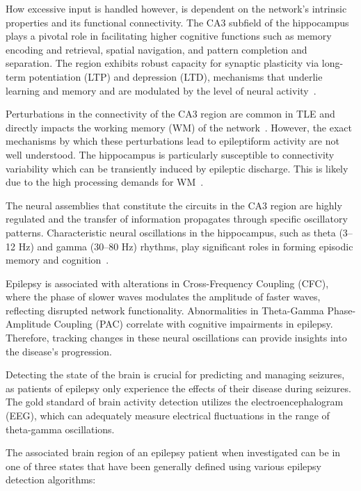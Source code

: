 How excessive input is handled however, is dependent on the network's intrinsic properties and its functional connectivity.
The CA3 subfield of the hippocampus plays a pivotal role in facilitating higher cognitive functions such as memory encoding and retrieval,
spatial navigation, and pattern completion and separation. The region exhibits robust capacity for synaptic plasticity via long-term potentiation
(LTP) and depression (LTD), mechanisms that underlie learning and memory and are modulated by the level of neural activity~\parencite{stokesComplementaryRolesHuman2015}.

Perturbations in the connectivity of the CA3 region are common in TLE and directly impacts the working memory (WM)
of the network~\parencite{arskiOscillatoryBasisWorking2021}. However, the exact mechanisms by which these perturbations lead to epileptiform
activity are not well understood. The hippocampus is particularly susceptible to connectivity variability which can be transiently induced by epileptic discharge.
This is likely due to the high processing demands for WM~\parencite{aldenkampEffectsEpileptiformEEG2004}.

The neural assemblies that constitute the circuits in the CA3 region are highly regulated and the transfer of
information propagates through specific oscillatory patterns.
Characteristic neural oscillations in the hippocampus, such as theta (3--12 Hz)
and gamma (30--80 Hz) rhythms, play significant roles in forming episodic memory and cognition~\parencite{nyhusFunctionalRoleGamma2010}.

Epilepsy is associated with alterations in Cross-Frequency Coupling (CFC), where
the phase of slower waves modulates the amplitude of faster waves, reflecting
disrupted network functionality. Abnormalities in Theta-Gamma Phase-Amplitude
Coupling (PAC) correlate with cognitive impairments in epilepsy. Therefore, tracking changes
in these neural oscillations can provide insights into the disease's progression.

Detecting the state of the brain is crucial for predicting and managing seizures, as patients of epilepsy
only experience the effects of their disease during seizures.
The gold standard of brain activity detection utilizes the electroencephalogram (EEG),
which can adequately measure electrical fluctuations in the range of theta-gamma oscillations.

The associated brain region of an epilepsy patient when investigated can be in one of three states that have been generally defined using
various epilepsy detection algorithms:

